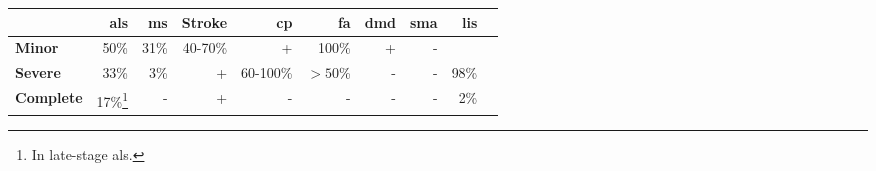 \begin{tabular}{Xrrrrrrrrr}
\toprule
    & \bfseries \acs{als} & \bfseries \acs{ms}   & \bfseries Stroke
    & \bfseries \acs{cp} & \bfseries\acs{fa} & \bfseries \acs{dmd} & \bfseries \acs{sma} & \bfseries \acs{lis} \\ \midrule
    \bfseries Minor    & 50\% & 31\% & 40-70\% & + & 100\% & + & - &      \\
    \bfseries Severe   & 33\% & 3\%  & +       & 60-100\% & $>50$\% &  - & - & 98\% \\
    \bfseries Complete & 17\%\footnote{In late-stage \ac{als}.} & -    & +
    & -&- & - & - & 2\%  \\
\bottomrule
\end{tabular}
